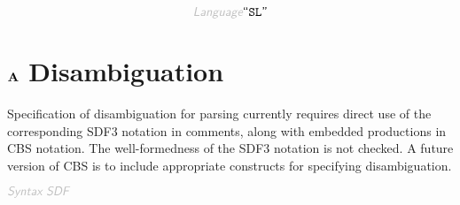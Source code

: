 \begin{displaymath}
\KEY{Language} \STRING{SL}
\end{displaymath}

\section*{$\SECT{A}$ Disambiguation}\hypertarget{secta-disambiguation}{}\label{secta-disambiguation}

Specification of disambiguation for parsing currently requires direct use of
  the corresponding SDF3 notation in comments, along with embedded productions
  in CBS notation. The well-formedness of the SDF3 notation is not checked.
  A future version of CBS is to include appropriate constructs for specifying
  disambiguation.

$\KEY{Syntax SDF}$

